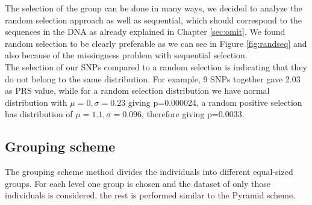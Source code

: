 \documentclass[letterpaper, 11pt]{article}
\begin{document}
The selection of the group can be done in many ways, we decided to analyze the random selection approach as well as sequential, which should correspond to the sequences in the DNA as already explained in Chapter \ref{sec:omit}. We found random selection to be clearly preferable as we can see in Figure \ref{fig:randseq} and also because of the missingness problem with sequential selection.\\

The selection of our SNPs compared to a random selection is indicating that they do not belong to the same distribution. For example, 9 SNPs together gave 2.03 as PRS value, while for a random selection distribution we have normal distribution with $\mu =0, \sigma=0.23$ giving p=0.000024, a random positive selection has distribution of $\mu =1.1, \sigma=0.096$, therefore giving p=0.0033. 
\subsection{Grouping scheme}
\begin{figure} [!h] 
\end{figure}
The grouping scheme method divides the individuals into different equal-sized groups. For each level one group is chosen and the dataset of only those individuals is considered, the rest is performed similar to the Pyramid scheme. 
\end{document}
